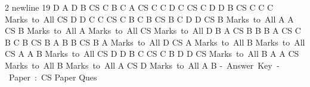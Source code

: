 \documentclass[a4paper,10pt,twoside]{article}
\begin{document}
\begin{multicols}{2}
{newline 19 \newline D \newline A \newline D \newline B \newline CS  \newline C \newline B \newline C \newline A \newline CS  \newline C \newline C \newline D \newline C \newline CS  \newline C \newline D \newline D \newline B \newline CS  \newline C \newline C \newline C \newline Marks to All \newline CS  \newline D \newline D \newline C \newline C \newline CS  \newline C \newline B \newline C \newline B \newline CS  \newline B \newline C \newline D \newline D \newline CS  \newline B \newline Marks to All \newline A \newline A \newline CS  \newline B \newline Marks to All \newline A \newline Marks to All \newline CS  \newline Marks to All \newline D \newline B \newline A \newline CS  \newline B \newline B \newline B \newline A \newline CS  \newline C \newline B \newline C \newline B \newline CS  \newline B \newline A \newline B \newline B \newline CS  \newline B \newline A \newline Marks to All \newline D \newline CS  \newline A \newline Marks to All \newline B \newline Marks to All \newline CS  \newline A \newline A \newline B \newline Marks to All \newline CS  \newline D \newline D \newline B \newline C \newline CS  \newline C \newline B \newline D \newline D \newline CS  \newline Marks to All \newline B \newline A \newline A \newline CS  \newline Marks to All \newline B \newline Marks to All \newline A \newline CS  \newline D \newline Marks to All \newline A \newline B \newline ‐ Answer Key ‐ Paper : CS \newline Paper \newline Ques}
\end{multicols}
\end{document}
